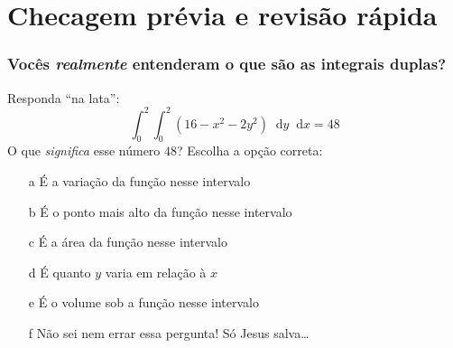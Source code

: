 \documentclass[pdftex, brazil, aspectratio=169]{beamer}
\newcommand*\diff{\mathop{}\!\mathrm{d}}
\begin{document}
\section{Checagem prévia e revisão rápida}

\begin{frame}[t]
	\frametitle{Vocês \emph{realmente} entenderam o que são as
          integrais duplas?}
  \begin{block}{Responda ``na lata'':}
    \begin{equation*}
      \int_{0}^{2} \int_{0}^{2} \left(16 - x^2 - 2y^2\right) \diff y \diff x = 48
    \end{equation*}
    O que \emph{significa} esse número $48$? Escolha a opção correta:
    \begin{itemize}
      \item[a] É a variação da função nesse intervalo
      \item[b] É o ponto mais alto da função nesse intervalo
      \item[c] É a área da função nesse intervalo
      \item[d] É quanto $y$ varia em relação à $x$
      \item[e] É o volume sob a função nesse intervalo
      \item[f] Não sei nem errar essa pergunta! Só Jesus salva\ldots
    \end{itemize}
  \end{block}
\end{frame}
\end{document}
